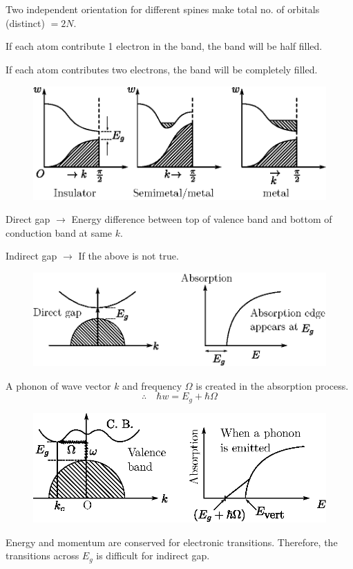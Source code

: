 \chapter[Lecture 22]{}\label{lec22}

Two independent orientation for different spines make total no. of orbitals (distinct) $=2N$.

If each atom contribute 1 electron in the band, the band will be half filled.

If each atom contributes two electrons, the band will be completely filled.
\begin{figure}[H]
\centering
\includegraphics{images/lecture22/fig1.eps}
\end{figure}
Direct gap $\to$ Energy difference between top of valence band and bottom of conduction band at same $k$.

Indirect gap $\to$ If the above is not true.
\begin{figure}[H]
\centering
\includegraphics{images/lecture22/fig2.eps}
\end{figure}
A phonon of wave vector $k$ and frequency $\Omega$ is created in the absorption process.
$$
\therefore\quad \hbar w=E_{g}+\hbar \Omega
$$
\begin{figure}[H]
\centering
\includegraphics{images/lecture22/fig3.eps}
\end{figure}
Energy and momentum are conserved for electronic transitions. Therefore, the transitions across $E_{g}$ is difficult for indirect gap.

